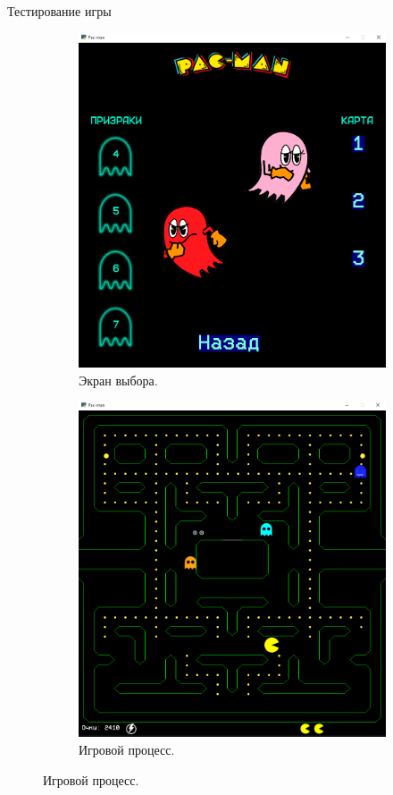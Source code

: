 \documentclass[12pt,a4paper,mathserif]{beamer}
\begin{document}
\begin{frame}{Тестирование игры}
    \begin{figure}
    \centering
    \begin{subfigure}{.5\textwidth}
      \centering
      \includegraphics[width=.8\linewidth]{src/3.png}
      \caption{Экран выбора.}
    \end{subfigure}%
    \begin{subfigure}{.5\textwidth}
      \centering
      \includegraphics[width=.8\linewidth]{src/5.png}
      \caption{Игровой процесс.}
    \end{subfigure}
    \end{figure}
\end{frame}
\end{document}

